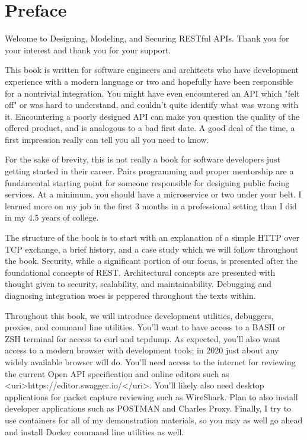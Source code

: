 \chapter*{Preface}

Welcome to Designing, Modeling, and Securing RESTful APIs.  Thank you for your interest and thank you for your support.

This book is written for software engineers and architects who have development experience with a modern language or two and hopefully have been responsible for a nontrivial integration.  You might have even encountered an API which "felt off" or was hard to understand, and couldn't quite identify what was wrong with it.  Encountering a poorly designed API can make you question the quality of the offered product, and is analogous to a bad first date.  A good deal of the time, a first impression really can tell you all you need to know.


For the sake of brevity, this is not really a book for software developers just getting started in their career.  Pairs programming and proper mentorship are a fundamental starting point for someone responsible for designing public facing services.  At a minimum, you should have a microservice or two under your belt.  I learned more on my job in the first 3 months in a professional setting than I did in my 4.5 years of college.

The structure of the book is to start with an explanation of a simple HTTP over TCP exchange, a brief history, and a case study which we will follow throughout the book.  Security, while a significant portion of our focus, is presented after the foundational concepts of REST.  Architectural concepts are presented with thought given to security, scalability, and maintainability. Debugging and diagnosing integration woes is peppered throughout the texts within.

Throughout this book, we will introduce development utilities, debuggers, proxies, and command line utilities.  You'll want to have access to a BASH or ZSH terminal for access to curl and tcpdump.  As expected, you'll also want access to a modern browser with development tools; in 2020 just about any widely available browser will do.  You'll need access to the internet for reviewing the current Open API specification and online editors such as <uri>https://editor.swagger.io/</uri>.  You'll likely also need desktop applications for packet capture reviewing such as WireShark.  Plan to also install developer applications such as POSTMAN and Charles Proxy.  Finally, I try to use containers for all of my demonstration materials, so you may as well go ahead and install Docker command line utilities as well.

